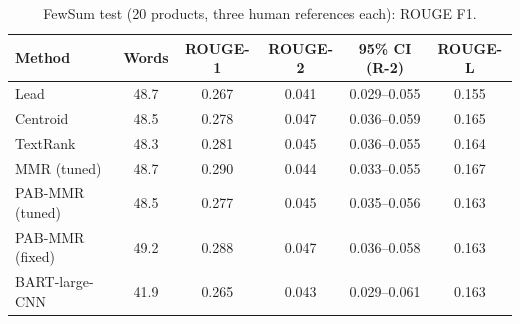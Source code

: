 \begin{table}[H]
\centering
\footnotesize
\caption{FewSum test (20 products, three human references each): ROUGE F1.}
\label{tab:fewsum}
\begin{tabular}{lccccc}
\toprule
Method & Words & ROUGE-1 & ROUGE-2 & 95\% CI (R-2) & ROUGE-L \\
\midrule
Lead & 48.7 & 0.267 & 0.041 & 0.029--0.055 & 0.155 \\
Centroid & 48.5 & 0.278 & 0.047 & 0.036--0.059 & 0.165 \\
TextRank & 48.3 & 0.281 & 0.045 & 0.036--0.055 & 0.164 \\
MMR (tuned) & 48.7 & 0.290 & 0.044 & 0.033--0.055 & 0.167 \\
PAB-MMR (tuned) & 48.5 & 0.277 & 0.045 & 0.035--0.056 & 0.163 \\
PAB-MMR (fixed) & 49.2 & 0.288 & 0.047 & 0.036--0.058 & 0.163 \\
BART-large-CNN & 41.9 & 0.265 & 0.043 & 0.029--0.061 & 0.163 \\
\bottomrule
\end{tabular}
\end{table}